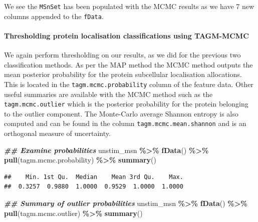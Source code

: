 \documentclass[9pt,a4paper,]{extarticle}
\newenvironment{Shaded}{\begin{snugshade}}{\end{snugshade}}
\newcommand{\DocumentationTok}[1]{\textcolor[rgb]{0.56,0.35,0.01}{\textbf{\textit{#1}}}}
\newcommand{\FunctionTok}[1]{\textcolor[rgb]{0.13,0.29,0.53}{\textbf{#1}}}
\newcommand{\NormalTok}[1]{#1}
\newcommand{\SpecialCharTok}[1]{\textcolor[rgb]{0.81,0.36,0.00}{\textbf{#1}}}
\begin{document}
We see the \texttt{MSnSet} has been populated with the MCMC results as we have 7 new
columns appended to the \texttt{fData}.

\paragraph{Thresholding protein localisation classifications using TAGM-MCMC}\label{thresholding-protein-localisation-classifications-using-tagm-mcmc}

We again perform thresholding on our results, as we did for the previous two
classification methods. As per the MAP method the MCMC method outputs the mean
posterior probability for the protein subcellular localisation allocations. This
is located in the \texttt{tagm.mcmc.probability} column of the feature data. Other
useful summaries are available with the MCMC method such as the
\texttt{tagm.mcmc.outlier} which is the posterior probability for the protein belonging
to the outlier component. The Monte-Carlo average Shannon entropy is also
computed and can be found in the column \texttt{tagm.mcmc.mean.shannon} and is an
orthogonal measure of uncertainty.

\begin{Shaded}
\begin{Highlighting}[]
\DocumentationTok{\#\# Examine probabilities}
\NormalTok{unstim\_msn }\SpecialCharTok{\%\textgreater{}\%}
  \FunctionTok{fData}\NormalTok{() }\SpecialCharTok{\%\textgreater{}\%} 
  \FunctionTok{pull}\NormalTok{(tagm.mcmc.probability) }\SpecialCharTok{\%\textgreater{}\%} 
  \FunctionTok{summary}\NormalTok{()}
\end{Highlighting}
\end{Shaded}

\begin{verbatim}
##    Min. 1st Qu.  Median    Mean 3rd Qu.    Max. 
##  0.3257  0.9880  1.0000  0.9529  1.0000  1.0000
\end{verbatim}

\begin{Shaded}
\begin{Highlighting}[]
\DocumentationTok{\#\# Summary of outlier probabilities}
\NormalTok{unstim\_msn }\SpecialCharTok{\%\textgreater{}\%}
  \FunctionTok{fData}\NormalTok{() }\SpecialCharTok{\%\textgreater{}\%} 
  \FunctionTok{pull}\NormalTok{(tagm.mcmc.outlier) }\SpecialCharTok{\%\textgreater{}\%} 
  \FunctionTok{summary}\NormalTok{()}
\end{Highlighting}
\end{Shaded}
\end{document}
